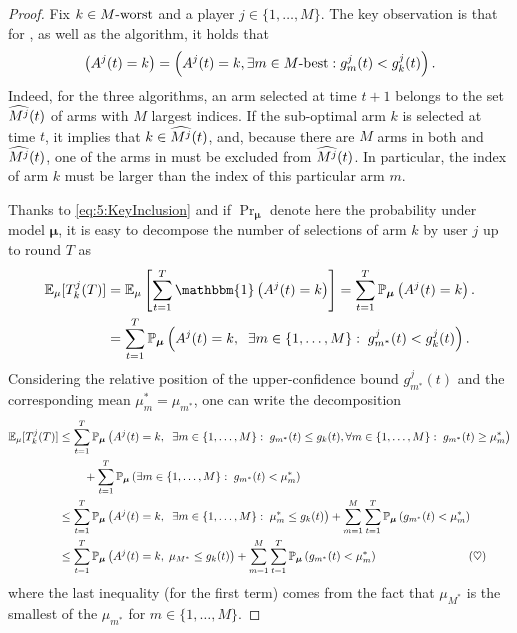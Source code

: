\begin{proof}
  Fix $k\in M\text{-}\mathrm{worst}$ and a player $j \in \{1,\dots,M\}$.
  The key observation is that for \MCTopM, \RandTopM{} as well as the \rhoRand{} algorithm, it holds that
  \begin{equation}\left(A^j(t) = k\right) = \left(A^j(t) = k , \exists m \in M\text{-}\mathrm{best} : g_m^j(t) < g_k^j(t) \right).\label{eq:5:KeyInclusion}\end{equation}
  Indeed, for the three algorithms, an arm selected at time $t+1$ belongs to the set $\widehat{M^j}(t)$ of arms with $M$ largest indices.
  If the sub-optimal arm $k$ is selected at time $t$, it implies that $k \in \widehat{M^j}(t)$, and, because there are $M$ arms in both \Mbest{} and $\widehat{M^j}(t)$, one of the arms in \Mbest{} must be excluded from $\widehat{M^j}(t)$.
  In particular, the index of arm $k$ must be larger than the index of this particular arm $m$.

  Thanks to \eqref{eq:5:KeyInclusion} and if $\Pr_{\bm{\mu}} $ denote here the probability under model $\bm{\mu}$, it is easy to decompose the number of selections of arm $k$ by user $j$ up to round $T$ as
  \begin{align*}
  \E_{\mu}[T_k^j(T)]
  &= \E_{\mu}\left[ \sum_{t=1}^T \mathbbm{1}\left( A^j(t) = k \right) \right]
  = \sum_{t=1}^T \Pr_{\bm{\mu}} \left( A^j(t) = k \right).\\
  &= \sum_{t=1}^T \Pr_{\bm{\mu}} \left( A^j(t) = k,\;\; \exists m \in\{1,\dots,M\}:\; g_{m^*}^j(t) < g_k^j(t) \right).
  \end{align*}
  Considering the relative position of the upper-confidence bound $g_{m^*}^j(t)$ and the corresponding mean $\mu_m^* = \mu_{m^*}$, one can write the decomposition
  \begin{align*}
    \E_{\mu}[T_k^j(T)] &\leq \sum_{t=1}^T\Pr_{\bm{\mu}} \left(A^j(t) = k,\;\; \exists m \in\{1,\dots,M\}:\; g_{m^*}(t) \leq g_k(t) , \forall m \in \{1,\dots,M\}: \;  g_{m^*}(t) \geq \mu_m^* \right)\\
    &\;\;\;\;\;\;\;\; + \sum_{t=1}^T\Pr_{\bm{\mu}} \left( \exists m \in\{1,\dots,M\}: \; g_{m^*}(t) < \mu_m^* \right) \\
    &\leq \sum_{t=1}^T\Pr_{\bm{\mu}} \left(A^j(t) = k,\;\; \exists m \in\{1,\dots,M\}:\; \mu_{m}^* \leq g_k(t)\right)+ \sum_{m=1}^M\sum_{t=1}^T\Pr_{\bm{\mu}} \left(g_{m^*}(t) < \mu_m^* \right) \\
    & \leq \sum_{t=1}^T \Pr_{\bm{\mu}} \left( A^j(t) = k,\; \mu_{M^*} \leq g_k(t) \right)
    + \sum_{m=1}^M \sum_{t=1}^T \Pr_{\bm{\mu}} \left( g_{m^*}(t) < \mu_m^* \right)
    \hspace*{80pt} (\heartsuit)  %
  \end{align*}
  where the last inequality (for the first term) comes from the fact that $\mu_{M^*}$ is the smallest of the $\mu_{m^*}$ for $m \in \{1, \dots,M\}$.


\end{proof}
